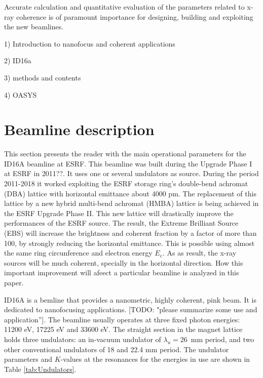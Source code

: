 \documentclass{iucr}              %
\newcommand{\todo}[1]{{\color{red}[TODO: "#1'']}}
\newcommand{\inred}[1]{{\color{red}#1}}
\begin{document}
Accurate calculation and quantitative evaluation of the parameters related to x-ray coherence is of paramount importance for designing, building and exploiting the new beamlines. 


1) Introduction to nanofocus and coherent applications 

2) ID16a 

3) methods and contents 

4) OASYS


\section{Beamline description}

This section presents the reader with the main operational parameters for the ID16A beamline at ESRF. This beamline was built during the Upgrade Phase I at ESRF in \inred{2011??}. It uses one or several undulators as source. During the period 2011-2018 it worked exploiting the ESRF storage ring’s double-bend achromat (DBA) lattice with horizontal emittance about 4000 pm. The replacement of this lattice by a new hybrid multi-bend achromat (HMBA) lattice is being achieved in the ESRF Upgrade Phase II. This new lattice will drastically improve the performances of the ESRF source. The result, the Extreme Brilliant Source (EBS) \cite{ESRF2014} will increase the brightness and coherent fraction by a factor of more than 100, by strongly reducing the horizontal emittance. This is possible using almost the same ring circunference and electron energy $E_e$. As as result, the x-ray sources will be much coherent, specially in the horizontal direction. How this important improvement will afeect a particular beamline is analyzed in this paper. 

ID16A \cite{ID16A} is a bemline that provides a nanometric, highly coherent, pink beam. It is dedicated to nanofocusing applications. \todo{please summarize some use and application}. The beamline usually operates at three fixed photon energies: 11200 eV, 17225 eV and 33600 eV. The straight section in the magnet lattice holds three undulators: an in-vacuum undulator of $\lambda_u=26$~mm period, and two other conventional undulators of 18 and 22.4 mm period. The undulator parameters and $K$-values at the resonances for the energies in use are shown in Table \ref{tab:Undulators}. 
\end{document}
